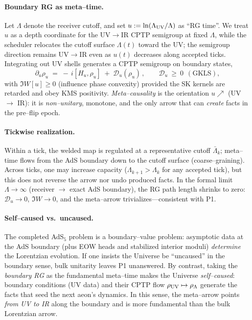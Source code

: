 \documentclass[10pt]{article}
\theoremstyle{definition}
\theoremstyle{plain}
\begin{document}
\paragraph{Boundary RG as meta–time.}\label{par:uom-main-113}
Let \(\Lambda\) denote the receiver cutoff, and set \(u:=\ln(\Lambda_{\rm UV} / \Lambda)\) as ``RG time''.
We treat \(u\) as a depth coordinate for the UV\(\to\)IR CPTP semigroup at fixed \(\Lambda\), while the scheduler
relocates the cutoff surface \(\Lambda(t)\) toward the UV; the semigroup direction remains UV\(\to\)IR even as
\(u(t)\) decreases along accepted ticks. Integrating out UV shells generates a CPTP semigroup on boundary states,
\[
\partial_u \rho_u\;=\;-\,i[H_u,\rho_u]\;+\;\mathcal D_u(\rho_u)\,,\qquad \mathcal D_u\ \ge\ 0\ \ (\text{GKLS}),
\]
with \(\Im W[u]\ge 0\) (influence phase convexity) provided the SK kernels are retarded and obey KMS positivity. 
\emph{Meta–causality} is the orientation \(u\!\nearrow\) (UV \(\to\) IR): it is \emph{non–unitary}, monotone, and the only arrow that can \emph{create} facts in the pre–flip epoch.

\paragraph{Tickwise realization.}\label{par:uom-main-114}
Within a tick, the welded map is regulated at a representative cutoff \(\bar\Lambda_k\); meta–time flows from the AdS boundary down to the cutoff surface (coarse–graining). Across ticks, one may increase capacity (\(\Lambda_{k+1}>\Lambda_k\) for any accepted tick), but this does not reverse the arrow nor undo produced facts.
In the formal limit \(\Lambda\to\infty\) (receiver \(\to\) exact AdS boundary), the RG path length shrinks to zero: \(\mathcal D_u\to 0\), \(\Im W\to 0\), and the meta–arrow trivializes—consistent with P1.

\paragraph{Self–caused vs.\ uncaused.}\label{par:uom-main-115}
The completed AdS$_5$ problem is a boundary–value problem: asymptotic data at the AdS boundary (plus EOW heads and stabilized interior moduli) \emph{determine} the Lorentzian evolution.
If one insists the Universe be ``uncaused'' in the boundary sense, bulk unitarity leaves P1 unanswered. 
By contrast, taking the \emph{boundary RG} as the fundamental meta–time makes the Universe \emph{self–caused}: boundary conditions (UV data) and their CPTP flow \(\rho_{\rm UV}\mapsto \rho_\Lambda\) generate the facts that seed the next aeon’s dynamics.
In this sense, the meta–arrow points \emph{from UV to IR} along the boundary and is more fundamental than the bulk Lorentzian arrow.
\end{document}

